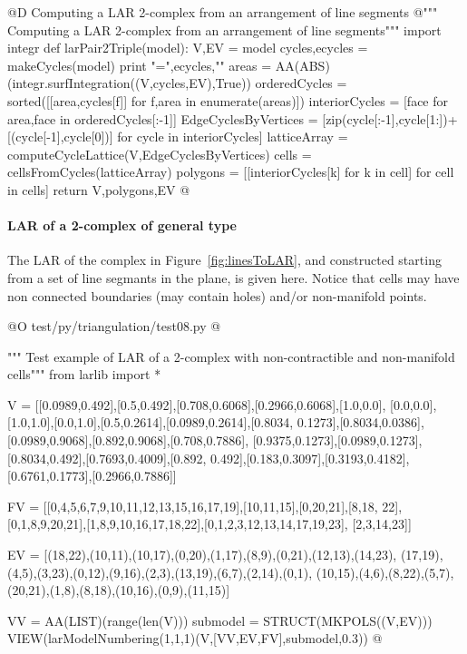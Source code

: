 \documentclass[11pt,oneside]{article}    %
\begin{document}
@D Computing a LAR 2-complex from an arrangement of line segments
@{""" Computing a LAR 2-complex from an arrangement of line segments"""
import integr
def larPair2Triple(model):
    V,EV = model
    cycles,ecycles = makeCycles(model)
    print "\necycles =",ecycles,"\n"
    areas = AA(ABS)(integr.surfIntegration((V,cycles,EV),True))
    orderedCycles = sorted([[area,cycles[f]] for f,area in enumerate(areas)])
    interiorCycles = [face for area,face in orderedCycles[:-1]]
    EdgeCyclesByVertices = [zip(cycle[:-1],cycle[1:])+[(cycle[-1],cycle[0])] 
                                for cycle in interiorCycles]
    latticeArray = computeCycleLattice(V,EdgeCyclesByVertices)
    cells = cellsFromCycles(latticeArray)
    polygons = [[interiorCycles[k] for k in cell] for cell in cells]
    return V,polygons,EV
@}



\paragraph{LAR of a 2-complex of general type}

The LAR of the complex in Figure~\ref{fig:linesToLAR}, and constructed starting from a set of line segmants in the plane, is given here. Notice that cells may have non connected boundaries (may contain holes) and/or non-manifold points.

@O test/py/triangulation/test08.py
@{""" Test example of LAR of a 2-complex with non-contractible and non-manifold cells"""
from larlib import *

V = [[0.0989,0.492],[0.5,0.492],[0.708,0.6068],[0.2966,0.6068],[1.0,0.0], 
[0.0,0.0],[1.0,1.0],[0.0,1.0],[0.5,0.2614],[0.0989,0.2614],[0.8034,
0.1273],[0.8034,0.0386],[0.0989,0.9068],[0.892,0.9068],[0.708,0.7886],
[0.9375,0.1273],[0.0989,0.1273],[0.8034,0.492],[0.7693,0.4009],[0.892,
0.492],[0.183,0.3097],[0.3193,0.4182],[0.6761,0.1773],[0.2966,0.7886]]

FV = [[0,4,5,6,7,9,10,11,12,13,15,16,17,19],[10,11,15],[0,20,21],[8,18,
22], [0,1,8,9,20,21],[1,8,9,10,16,17,18,22],[0,1,2,3,12,13,14,17,19,23],
[2,3,14,23]]

EV = [(18,22),(10,11),(10,17),(0,20),(1,17),(8,9),(0,21),(12,13),(14,23), 
(17,19),(4,5),(3,23),(0,12),(9,16),(2,3),(13,19),(6,7),(2,14),(0,1),
(10,15),(4,6),(8,22),(5,7),(20,21),(1,8),(8,18),(10,16),(0,9),(11,15)]

VV = AA(LIST)(range(len(V)))
submodel = STRUCT(MKPOLS((V,EV)))        
VIEW(larModelNumbering(1,1,1)(V,[VV,EV,FV],submodel,0.3)) 
@}
\end{document}
